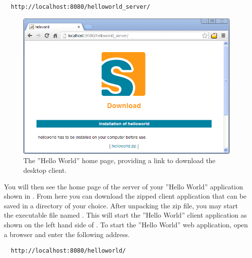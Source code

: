 \documentclass[a4paper,10pt,twoside]{book}
\begin{document}
\begin{lstlisting}
  http://localhost:8080/helloworld_server/
\end{lstlisting}

\begin{figure}
\includegraphics[width=15cm]{tomcat_helloworld_download.png}
\caption{The ''Hello World'' home page, providing a link to download the desktop client.}
\end{figure}

You will then see the home page of the server of your ''Hello World'' application shown in .
From here you can download the zipped client application that can be saved in a directory of your choice.
After unpacking the zip file, you may start the executable file named .
This will start the ''Hello World'' client application as shown on the left hand side of .
To start the ''Hello World'' web application, open a browser and enter the following address.

\begin{lstlisting}
  http://localhost:8080/helloworld/
\end{lstlisting}
\end{document}
